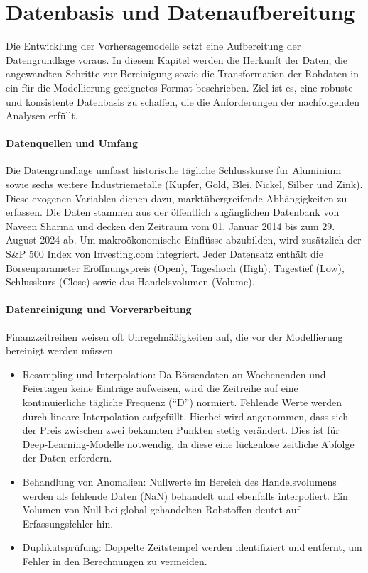 \section{Datenbasis und Datenaufbereitung}
\label{sec:datenbasis_und_datenaufbereitung}

Die Entwicklung der Vorhersagemodelle setzt eine Aufbereitung der Datengrundlage voraus. In diesem Kapitel werden die Herkunft der Daten, die angewandten Schritte zur Bereinigung sowie die Transformation der Rohdaten in ein für die Modellierung geeignetes Format beschrieben. Ziel ist es, eine robuste und konsistente Datenbasis zu schaffen, die die Anforderungen der nachfolgenden Analysen erfüllt.

\paragraph{Datenquellen und Umfang}
Die Datengrundlage umfasst historische tägliche Schlusskurse für Aluminium sowie sechs weitere Industriemetalle (Kupfer, Gold, Blei, Nickel, Silber und Zink). Diese exogenen Variablen dienen dazu, marktübergreifende Abhängigkeiten zu erfassen. Die Daten stammen aus der öffentlich zugänglichen Datenbank von Naveen Sharma \cite{naveennas_metal_price_prediction_2024} und decken den Zeitraum vom 01. Januar 2014 bis zum 29. August 2024 ab. Um makroökonomische Einflüsse abzubilden, wird zusätzlich der S\&P 500 Index von Investing.com \cite{investing_sp500_historical_2026} integriert. Jeder Datensatz enthält die Börsenparameter Eröffnungspreis (Open), Tageshoch (High), Tagestief (Low), Schlusskurs (Close) sowie das Handelsvolumen (Volume).

\paragraph{Datenreinigung und Vorverarbeitung}
Finanzzeitreihen weisen oft Unregelmäßigkeiten auf, die vor der Modellierung bereinigt werden müssen.
\begin{itemize}
    \item Resampling und Interpolation: Da Börsendaten an Wochenenden und Feiertagen keine Einträge aufweisen, wird die Zeitreihe auf eine kontinuierliche tägliche Frequenz (``D'') normiert. Fehlende Werte werden durch lineare Interpolation aufgefüllt. Hierbei wird angenommen, dass sich der Preis zwischen zwei bekannten Punkten stetig verändert. Dies ist für Deep-Learning-Modelle notwendig, da diese eine lückenlose zeitliche Abfolge der Daten erfordern.
    \item Behandlung von Anomalien: Nullwerte im Bereich des Handelsvolumens werden als fehlende Daten (NaN) behandelt und ebenfalls interpoliert. Ein Volumen von Null bei global gehandelten Rohstoffen deutet auf Erfassungsfehler hin.
    \item Duplikatsprüfung: Doppelte Zeitstempel werden identifiziert und entfernt, um Fehler in den Berechnungen zu vermeiden.
\end{itemize}

